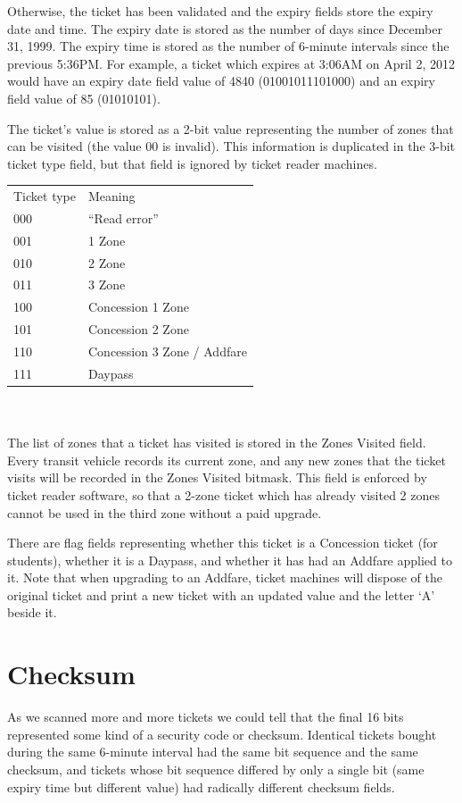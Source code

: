 \documentclass[fontsize=12pt]{scrartcl}
\begin{document}
Otherwise, the ticket has been validated and the expiry fields store the expiry date and time. The expiry date is stored as the number of days since December 31, 1999. The expiry time is stored as the number of 6-minute intervals since the previous 5:36PM. For example, a ticket which expires at 3:06AM on April 2, 2012 would have an expiry date field value of 4840 (01001011101000) and an expiry field value of 85 (01010101).

The ticket's value is stored as a 2-bit value representing the number of zones that can be visited (the value 00 is invalid). This information is duplicated in the 3-bit ticket type field, but that field is ignored by ticket reader machines.
\\

\begin{tabular}{ll}
Ticket type & Meaning \\
000 & ``Read error'' \\
001 & 1 Zone \\
010 & 2 Zone \\
011 & 3 Zone \\
100 & Concession 1 Zone \\
101 & Concession 2 Zone \\
110 & Concession 3 Zone / Addfare \\
111 & Daypass
\end{tabular}
\\
\\

The list of zones that a ticket has visited is stored in the Zones Visited field. Every transit vehicle records its current zone, and any new zones that the ticket visits will be recorded in the Zones Visited bitmask. This field is enforced by ticket reader software, so that a 2-zone ticket which has already visited 2 zones cannot be used in the third zone without a paid upgrade.

There are flag fields representing whether this ticket is a Concession ticket (for students), whether it is a Daypass, and whether it has had an Addfare applied to it. Note that when upgrading to an Addfare, ticket machines will dispose of the original ticket and print a new ticket with an updated value and the letter `A' beside it.

\section{Checksum}
As we scanned more and more tickets we could tell that the final 16 bits represented some kind of a security code or checksum. Identical tickets bought during the same 6-minute interval had the same bit sequence and the same checksum, and tickets whose bit sequence differed by only a single bit (same expiry time but different value) had radically different checksum fields.
\end{document}
